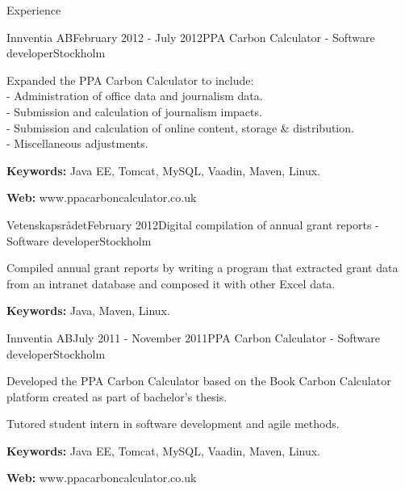 \documentclass{resume}
\begin{document}
\begin{rSection}{Experience}
    \begin{rSubsection}{Innventia AB}{February 2012 - July 2012}{PPA Carbon Calculator - Software developer}{Stockholm}
      \item Expanded the PPA Carbon Calculator to include:\\
      - Administration of office data and journalism data. \\
      - Submission and calculation of journalism impacts.\\
      - Submission and calculation of online content, storage \& distribution.\\
      - Miscellaneous adjustments.
      \item \textbf{Keywords:} Java EE, Tomcat, MySQL, Vaadin, Maven, Linux.
      \item \textbf{Web:} www.ppacarboncalculator.co.uk
    \end{rSubsection}

    \begin{rSubsection}{Vetenskapsrådet}{February 2012}{Digital compilation of annual grant reports - Software developer}{Stockholm}
      \item Compiled annual grant reports by writing a program that extracted grant data from an intranet database and composed it with other Excel data.
      \item \textbf{Keywords:} Java, Maven, Linux.
    \end{rSubsection}

    \begin{rSubsection}{Innventia AB}{July 2011 - November 2011}{PPA Carbon Calculator - Software developer}{Stockholm}
      \item Developed the PPA Carbon Calculator based on the Book Carbon Calculator platform created as part of bachelor's thesis.
      \item Tutored student intern in software development and agile methods.
      \item \textbf{Keywords:} Java EE, Tomcat, MySQL, Vaadin, Maven, Linux.
      \item \textbf{Web:} www.ppacarboncalculator.co.uk
    \end{rSubsection}
  \end{rSection}
\end{document}
